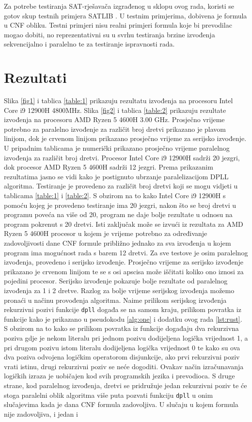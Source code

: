\documentclass[hidelinks, conference]{IEEEtran}
\begin{document}
Za potrebe testiranja SAT-rješavača izgrađenog u sklopu ovog rada, koristi se gotov skup testnih primjera SATLIB \cite{b5}. U testnim primjerima, dobivena je formula u CNF obliku. Testni primjeri nisu realni primjeri formula koje bi prevodilac mogao dobiti, no reprezentativni su u svrhu testiranja brzine izvođenja sekvencijalno i paralelno te za testiranje ispravnosti rada.

\section{Rezultati}

Slika \ref{fig1} i tablica \ref{table:1} prikazuju rezultatu izvođenja na procesoru Intel Core i9 12900H 4800MHz. Slika \ref{fig2} i tablica \ref{table:2} prikazuju rezultate izvođenja na procesoru AMD Ryzen 5 4600H 3.00 GHz. Prosječno vrijeme potrebno za paralelno izvođenje za različit broj dretvi prikazano je plavom linijom, dok je crvenom linijom prikazano prosječno vrijeme za serijsko izvođenje. U pripadnim tablicama je numerički prikazano prosječno vrijeme paralelnog izvođenja za različit broj dretvi. Procesor Intel Core i9 12900H sadrži 20 jezgri, dok procesor AMD Ryzen 5 4600H sadrži 12 jezgri. Prema prikazanim rezultatima jasno se vidi kako je postignuto ubrzanje paralelizacijom DPLL algoritma. Testiranje je provedeno za različit broj dretvi koji se mogu vidjeti u tablicama \ref{table:1} i \ref{table:2}. S obzirom na to kako Intel Core i9 12900H s pomoću kojeg je provedeno testiranje ima 20 jezgri, nakon što se broj dretvi u programu poveća na više od 20, program ne daje bolje rezultate u odnosu na program pokrenut s 20 dretvi. Isti zaključak može se izvući iz rezultata za AMD Ryzen 5 4600H procesor u kojem je vrijeme potrebno za određivanje zadovoljivosti dane CNF formule približno jednako za sva izvođenja u kojem program ima mogućnost rada s barem 12 dretvi. Za sve testove je osim paralelnog izvođenja, provedeno i serijsko izvođenje. Prosječno vrijeme za serijsko izvođenje prikazano je crvenom linijom te se s osi apscisa može iščitati koliko ono iznosi za pojedini procesor. Serijsko izvođenje pokazuje bolje rezultate od paralelnog izvođenja za 1 i 2 dretve. Razlog za bolje vrijeme serijskog izvođenja možemo pronaći u načinu provođenja algoritma. Naime prilikom serijskog izvođenja rekurzivni pozivi funkcije \texttt{dpll} događa se na samom kraju, prilikom povratka iz funkcije kako je prikazano u pseudokodu \ref{alg:one} i dodatku ovog rada \ref{lst:rust}. S obzirom na to kako se prilikom povratka iz funkcije događaju dva rekurzivna poziva gdje je nekom literalu pri jednom pozivu dodijeljena logička vrijednost 1, a pri drugom pozivu istom literalu dodijeljena logička vrijednost 0 te kako su ova dva poziva odvojena logičkim operatorom disjunkcije, ako prvi rekurzivni poziv vrati istinu, drugi rekurzivni poziv se neće dogoditi. Ovakav način izračunavanja logičkih izraza je uobičajen kod svih programskih jezika i prevodioca. S druge strane, kod paralelnog izvođenja, dretvi se pridružuje jedan rekurzivni poziv te će stoga paralelni oblik algoritma više puta pozvati funkciju \texttt{dpll} u onim slučajevima kada je dana CNF formula zadovoljiva. U slučaju u kojem formula nije zadovoljiva, i jedan i 
\end{document}
